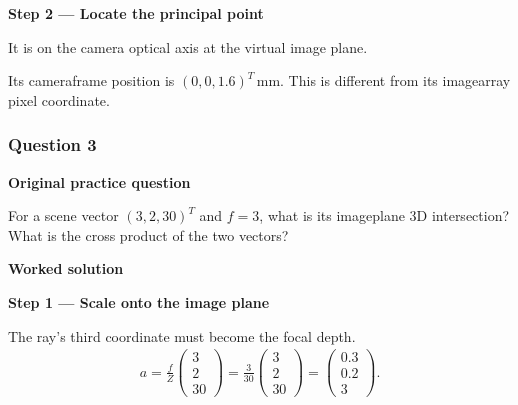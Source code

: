\documentclass[letterpaper,11pt,english,openany,oneside]{jupyterBook}
\begin{document}
\par\medskip{}
{\color{QuizStepRed}\bfseries Step 2 — Locate the principal point}\par\smallskip

\sphinxAtStartPar
{} It is on the camera optical axis at the virtual image plane.

\sphinxAtStartPar
Its camera\sphinxhyphen{}frame position is {\color{QuizMathBlue} \((0,0,1.6)^T\,\mathrm{mm}\)}. This is different from its image\sphinxhyphen{}array pixel coordinate.

\par

\par\medskip


\subsubsection{Question 3}
\label{\detokenize{lectures/lecture03/tldr:question-3}}\label{\detokenize{lectures/lecture03/tldr:lec03-tldr-q3}}
\par\medskip\textbf{Original practice question}\par\smallskip

\sphinxAtStartPar
For a scene vector \((3,2,30)^T\) and \(f=3\), what is its image\sphinxhyphen{}plane 3D intersection? What is the cross product of the two vectors?

\par\medskip

\par\medskip
\textbf{Worked solution}\par\smallskip

\par\medskip{}
{\color{QuizStepRed}\bfseries Step 1 — Scale onto the image plane}\par\smallskip

\sphinxAtStartPar
{} The ray’s third coordinate must become the focal depth.
{\color{QuizMathBlue} \begin{equation*}
\begin{split}
a=\frac{f}{Z}\begin{pmatrix}3\\2\\30\end{pmatrix}=\frac3{30}\begin{pmatrix}3\\2\\30\end{pmatrix}=\begin{pmatrix}0.3\\0.2\\3\end{pmatrix}.
\end{split}
\end{equation*}}
\par
\end{document}
